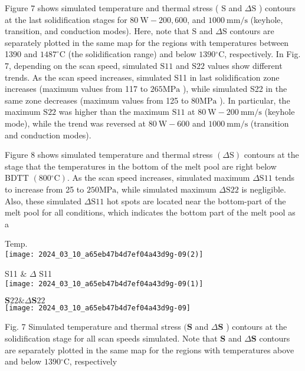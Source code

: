 \documentclass[10pt]{article}
\begin{document}
Figure 7 shows simulated temperature and thermal stress ( $\mathrm{S}$ and $\Delta \mathrm{S}$ ) contours at the last solidification stages for $80 \mathrm{~W}-200,600$, and $1000 \mathrm{~mm} / \mathrm{s}$ (keyhole, transition, and conduction modes). Here, note that $\mathrm{S}$ and $\Delta \mathrm{S}$ contours are separately plotted in the same map for the regions with temperatures between 1390 and $1487^{\circ} \mathrm{C}$ (the solidification range) and below $1390{ }^{\circ} \mathrm{C}$, respectively. In Fig. 7, depending on the scan speed, simulated $\mathrm{S} 11$ and $\mathrm{S} 22$ values show different trends. As the scan speed increases, simulated S11 in last solidification zone increases (maximum values from 117 to $265 \mathrm{MPa}$ ), while simulated S22 in the same zone decreases (maximum values from 125 to $80 \mathrm{MPa}$ ). In particular, the maximum $\mathrm{S} 22$ was higher than the maximum $\mathrm{S} 11$ at $80 \mathrm{~W}-200 \mathrm{~mm} / \mathrm{s}$ (keyhole mode), while the trend was reversed at $80 \mathrm{~W}-600$ and $1000 \mathrm{~mm} / \mathrm{s}$ (transition and conduction modes).

Figure 8 shows simulated temperature and thermal stress $(\Delta \mathrm{S})$ contours at the stage that the temperatures in the bottom of the melt pool are right below BDTT $\left(800{ }^{\circ} \mathrm{C}\right)$. As the scan speed increases, simulated maximum $\Delta \mathrm{S} 11$ tends to increase from 25 to $250 \mathrm{MPa}$, while simulated maximum $\Delta \mathrm{S} 22$ is negligible. Also, these simulated $\Delta \mathrm{S} 11$ hot spots are located near the bottom-part of the melt pool for all conditions, which indicates the bottom part of the melt pool as a

Temp.\\
\texttt{[image: 2024\_03\_10\_a65eb47b4d7ef04a43d9g-09(2)]}

S11 \& $\Delta$ S11\\
\texttt{[image: 2024\_03\_10\_a65eb47b4d7ef04a43d9g-09(1)]}

$\mathbf{S} 22 \& \Delta \mathbf{S} 22$\\
\texttt{[image: 2024\_03\_10\_a65eb47b4d7ef04a43d9g-09]}

Fig. 7 Simulated temperature and thermal stress $(\boldsymbol{S}$ and $\Delta \boldsymbol{S}$ ) contours at the solidification stage for all scan speeds simulated. Note that $\boldsymbol{S}$ and $\Delta \boldsymbol{S}$ contours are separately plotted in the same map for the regions with temperatures above and below $1390{ }^{\circ} \mathrm{C}$, respectively
\end{document}

